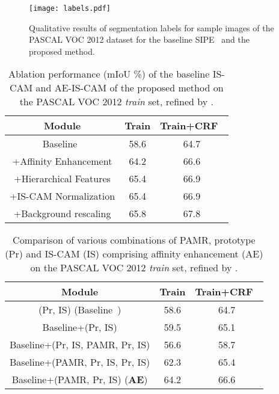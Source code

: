 \documentclass{article}
\begin{document}
\begin{figure*}[htb]
  \centering
  \centerline{\texttt{[image: labels.pdf]}}
\caption{Qualitative results of segmentation labels for sample images of the PASCAL VOC 2012 dataset for the baseline SIPE~\cite{SIPE} and the proposed method.}
\label{fig:comp_qual}
\end{figure*}


\begin{table}[htb]
\centering
\caption{Ablation performance (mIoU \%) of the baseline IS-CAM and AE-IS-CAM of the proposed method on the PASCAL VOC 2012 \emph {train} set, refined by \cite{CRF}.} 
\begin{tabular}{c  c  c }
\toprule%
Module & Train & Train+CRF~\cite{CRF} \\
\midrule%
Baseline~\cite{SIPE} & 58.6 & 64.7\\
+Affinity Enhancement & 64.2 & 66.6\\
+Hierarchical Features & 65.4 & 66.9\\
+IS-CAM Normalization & 65.4 & 66.9\\
+Background rescaling  &65.8 & 67.8\\
\bottomrule%
\end{tabular}
\label{tbl:abl}
\end{table}


\begin{table}[htb]
\centering
\caption{Comparison of various combinations of PAMR, prototype (Pr) and IS-CAM (IS) comprising affinity enhancement (AE) on the PASCAL VOC 2012 \emph {train} set, refined by \cite{CRF}.} 
\begin{tabular}{c  c  c }
\toprule%
Module & Train & Train+CRF~\cite{CRF} \\
\midrule%
(Pr, IS) (Baseline~\cite{SIPE}) & 58.6 & 64.7\\
Baseline+(Pr, IS) & 59.5 & 65.1\\
Baseline+(Pr, IS, PAMR, Pr, IS) & 56.6	& 58.7 \\
Baseline+(PAMR, Pr, IS, Pr, IS) & 62.3 & 65.4\\
Baseline+(PAMR, Pr, IS) (\textbf{AE}) & 64.2 & 66.6\\
\bottomrule%
\end{tabular}
\label{tbl:var}
\end{table}
\end{document}
